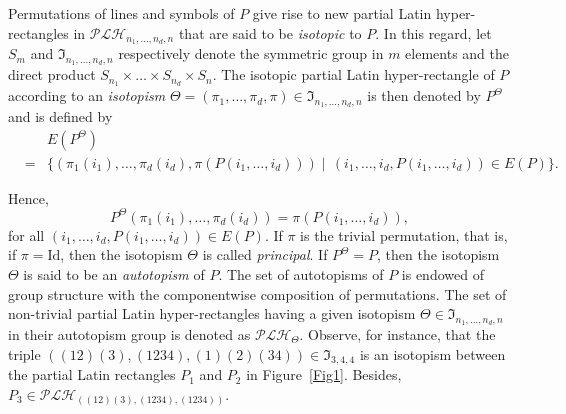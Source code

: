 \documentclass{article}
\begin{document}
  Permutations of lines and symbols of $P$ give rise to new partial Latin hyper-rectangles in $\mathcal{PLH}_{n_1,\ldots,n_d,n}$ that are said to be {\em isotopic} to $P$. In this regard, let $S_m$ and 
 $\mathfrak{I}_{n_1,\ldots,n_d,n}$ respectively denote the symmetric group in $m$ elements and the direct product $S_{n_1}\times\ldots\times S_{n_d}\times S_n$. The isotopic partial Latin hyper-rectangle of $P$ according 
 to an {\em isotopism} $\Theta=(\pi_1,\ldots,\pi_d,\pi)\in \mathfrak{I}_{n_1,\ldots,n_d,n}$ is then denoted by $P^{\Theta}$ and is defined by
\begin{eqnarray*}
&&E(P^{\Theta})\\
&=&\{(\pi_1(i_1),\ldots,\pi_d(i_d),\pi(P(i_1,\ldots,i_d)))\mid\,(i_1,\ldots,i_d,P(i_1,\ldots,i_d))\in E(P)\}.
\end{eqnarray*} 

Hence, 
\[P^{\Theta}(\pi_1(i_1),\ldots,\pi_d(i_d))=\pi(P(i_1,\ldots,i_d)),\] 
for all $(i_1,\ldots,i_d,P(i_1,\ldots,i_d))\in E(P)$. If $\pi$ is the trivial permutation, 
 that is, if $\pi=\mathrm{Id}$, then the isotopism $\Theta$ is called {\em principal}. If \mbox{$P^{\Theta}=P$,} then the isotopism $\Theta$ is said to be an {\em autotopism} of $P$. The set of autotopisms of $P$ is 
 endowed of group structure with the componentwise composition of permutations. The set of non-trivial partial Latin hyper-rectangles having a given isotopism $\Theta\in\mathfrak{I}_{n_1,\ldots,n_d,n}$ in their 
 autotopism group is denoted as $\mathcal{PLH}_{\Theta}$. Observe, for instance, that the triple $((12)(3),(1234),(1)(2)(34))\in\mathfrak{I}_{3,4,4}$ is an isotopism between the partial Latin rectangles $P_1$ and $P_2$ 
 in Figure~\ref{Fig1}. Besides, $P_3\in\mathcal{PLH}_{((12)(3),(1234),(1234))}$.
\end{document}
